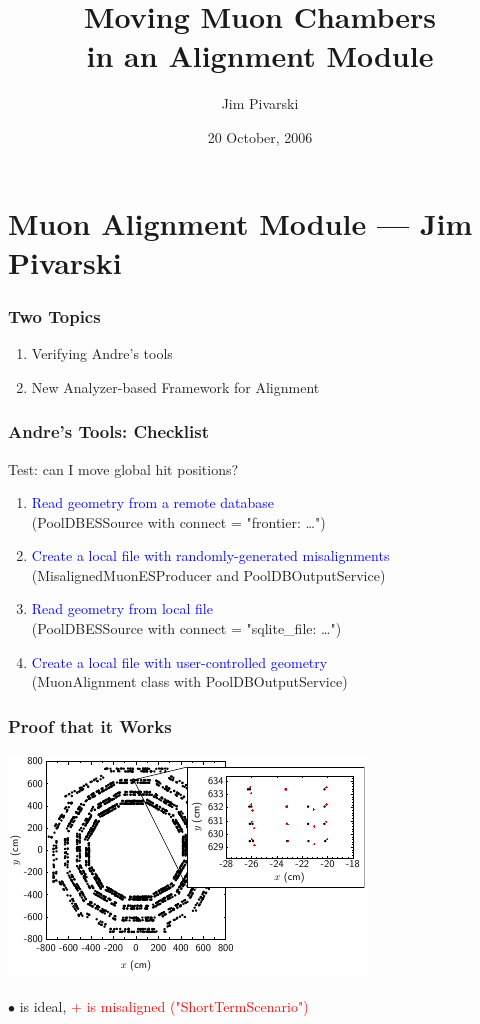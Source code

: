 \documentclass[12pt,compress]{beamer}
\title{Moving Muon Chambers \\ in an Alignment Module}
\author{Jim Pivarski}
\institute{Texas A\&M University}
\date{20 October, 2006}
\begin{document}
\frame{\titlepage}
\section*{Muon Alignment Module --- Jim Pivarski}

\begin{frame}
\frametitle{Two Topics}
\begin{enumerate}\setlength{\itemsep}{1 cm}
\item Verifying Andre's tools
\item New Analyzer-based Framework for Alignment
\end{enumerate}
\vfill
\end{frame}

\begin{frame}
\frametitle{Andre's Tools: Checklist}

Test: can I move global hit positions?

\begin{enumerate}[$\surd$ ]\setlength{\itemsep}{0.5 cm}
\item \textcolor{blue}{Read geometry from a remote database} \\ (PoolDBESSource with connect = "frontier: \ldots")
\item \textcolor{blue}{Create a local file with randomly-generated misalignments} \\ (MisalignedMuonESProducer and PoolDBOutputService)
\item \textcolor{blue}{Read geometry from local file} \\ (PoolDBESSource with connect = "sqlite\_file: \ldots")
\item \textcolor{blue}{Create a local file with user-controlled geometry} \\ (MuonAlignment class with PoolDBOutputService)
\end{enumerate}
\end{frame}

\begin{frame}
\frametitle{Proof that it Works}
\begin{center}
\includegraphics[width=0.9\linewidth]{misalignment_producer}

$\bullet$ is ideal, \textcolor{red}{$+$ is misaligned ("ShortTermScenario")}
\end{center}
\end{frame}
\end{document}
